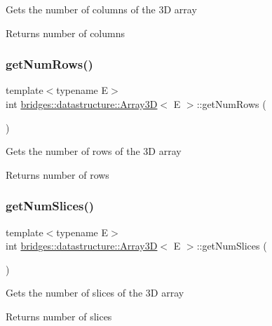 Gets the number of columns of the 3D array \begin{DoxyReturn}{Returns}
number of columns 
\end{DoxyReturn}
\mbox{\label{classbridges_1_1datastructure_1_1_array3_d_a73aebe1098512ca4196cb8da0eb493fe}} 
\subsubsection{\texorpdfstring{get\+Num\+Rows()}{getNumRows()}}
{\footnotesize\ttfamily template$<$typename E$>$ \\
int \hyperlink{classbridges_1_1datastructure_1_1_array3_d}{bridges\+::datastructure\+::\+Array3D}$<$ E $>$\+::get\+Num\+Rows (\begin{DoxyParamCaption}{ }\end{DoxyParamCaption})\hspace{0.3cm}{\ttfamily [inline]}}

Gets the number of rows of the 3D array \begin{DoxyReturn}{Returns}
number of rows 
\end{DoxyReturn}
\mbox{\label{classbridges_1_1datastructure_1_1_array3_d_ad2fb0a0b8be702944c25b6fc807263f7}} 
\subsubsection{\texorpdfstring{get\+Num\+Slices()}{getNumSlices()}}
{\footnotesize\ttfamily template$<$typename E$>$ \\
int \hyperlink{classbridges_1_1datastructure_1_1_array3_d}{bridges\+::datastructure\+::\+Array3D}$<$ E $>$\+::get\+Num\+Slices (\begin{DoxyParamCaption}{ }\end{DoxyParamCaption})\hspace{0.3cm}{\ttfamily [inline]}}

Gets the number of slices of the 3D array \begin{DoxyReturn}{Returns}
number of slices 
\end{DoxyReturn}
\mbox{\label{classbridges_1_1datastructure_1_1_array3_d_a0b285b00e5d152d2968bee6b3aaf9349}} 
